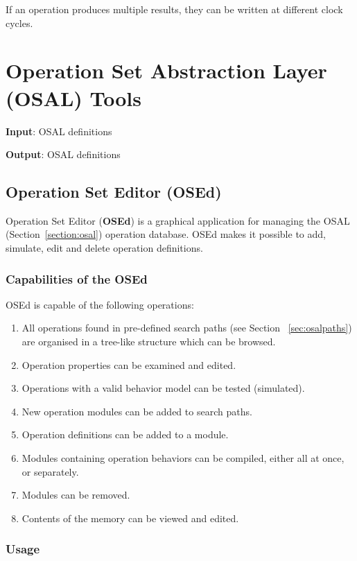 \documentclass[a4paper,twoside]{tceusermanual}
\begin{document}
If an operation produces multiple results, they can be written at different
clock cycles.

\section{Operation Set Abstraction Layer (OSAL) Tools}
\label{sec:osalTools}

 
\textbf{Input}: OSAL definitions 

\textbf{Output}: OSAL definitions

\subsection{Operation Set Editor (OSEd)}
\label{sec:osed}

Operation Set Editor (\textbf{OSEd}) is a graphical application for managing
the OSAL (Section~\ref{section:osal}) operation database. OSEd makes it possible
to add, simulate, edit and delete operation definitions. 

\subsubsection{Capabilities of the OSEd}

OSEd is capable of the following operations:

\begin{enumerate}
\item%
  All operations found in pre-defined search paths (see Section
  ~\ref{sec:osalpaths}) are organised in a tree-like structure which can be
  browsed.
\item%
  Operation properties can be examined and edited.
\item%
  Operations with a valid behavior model can be tested (simulated).
\item%
  New operation modules can be added to search paths.
\item%
  Operation definitions can be added to a module.
\item%
  Modules containing operation behaviors can be compiled, either all at
  once, or separately.
\item%
  Modules can be removed.
\item%
  Contents of the memory can be viewed and edited.
\end{enumerate}

\subsubsection{Usage}
\end{document}
